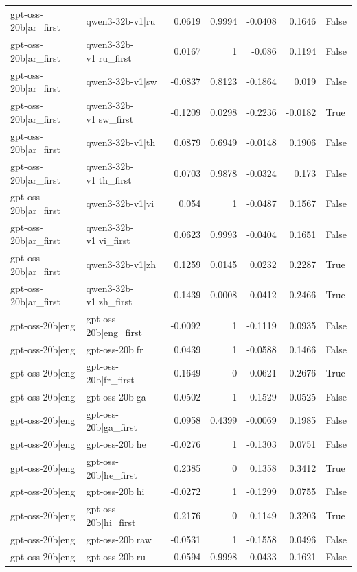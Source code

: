 \begin{table}
\begin{tabular}{l l r r r r l}
gpt-oss-20b|ar_first & qwen3-32b-v1|ru & 0.0619 & 0.9994 & -0.0408 & 0.1646 & False \\
gpt-oss-20b|ar_first & qwen3-32b-v1|ru_first & 0.0167 & 1 & -0.086 & 0.1194 & False \\
gpt-oss-20b|ar_first & qwen3-32b-v1|sw & -0.0837 & 0.8123 & -0.1864 & 0.019 & False \\
gpt-oss-20b|ar_first & qwen3-32b-v1|sw_first & -0.1209 & 0.0298 & -0.2236 & -0.0182 & True \\
gpt-oss-20b|ar_first & qwen3-32b-v1|th & 0.0879 & 0.6949 & -0.0148 & 0.1906 & False \\
gpt-oss-20b|ar_first & qwen3-32b-v1|th_first & 0.0703 & 0.9878 & -0.0324 & 0.173 & False \\
gpt-oss-20b|ar_first & qwen3-32b-v1|vi & 0.054 & 1 & -0.0487 & 0.1567 & False \\
gpt-oss-20b|ar_first & qwen3-32b-v1|vi_first & 0.0623 & 0.9993 & -0.0404 & 0.1651 & False \\
gpt-oss-20b|ar_first & qwen3-32b-v1|zh & 0.1259 & 0.0145 & 0.0232 & 0.2287 & True \\
gpt-oss-20b|ar_first & qwen3-32b-v1|zh_first & 0.1439 & 0.0008 & 0.0412 & 0.2466 & True \\
gpt-oss-20b|eng & gpt-oss-20b|eng_first & -0.0092 & 1 & -0.1119 & 0.0935 & False \\
gpt-oss-20b|eng & gpt-oss-20b|fr & 0.0439 & 1 & -0.0588 & 0.1466 & False \\
gpt-oss-20b|eng & gpt-oss-20b|fr_first & 0.1649 & 0 & 0.0621 & 0.2676 & True \\
gpt-oss-20b|eng & gpt-oss-20b|ga & -0.0502 & 1 & -0.1529 & 0.0525 & False \\
gpt-oss-20b|eng & gpt-oss-20b|ga_first & 0.0958 & 0.4399 & -0.0069 & 0.1985 & False \\
gpt-oss-20b|eng & gpt-oss-20b|he & -0.0276 & 1 & -0.1303 & 0.0751 & False \\
gpt-oss-20b|eng & gpt-oss-20b|he_first & 0.2385 & 0 & 0.1358 & 0.3412 & True \\
gpt-oss-20b|eng & gpt-oss-20b|hi & -0.0272 & 1 & -0.1299 & 0.0755 & False \\
gpt-oss-20b|eng & gpt-oss-20b|hi_first & 0.2176 & 0 & 0.1149 & 0.3203 & True \\
gpt-oss-20b|eng & gpt-oss-20b|raw & -0.0531 & 1 & -0.1558 & 0.0496 & False \\
gpt-oss-20b|eng & gpt-oss-20b|ru & 0.0594 & 0.9998 & -0.0433 & 0.1621 & False \\

\end{tabular}
\end{table}
